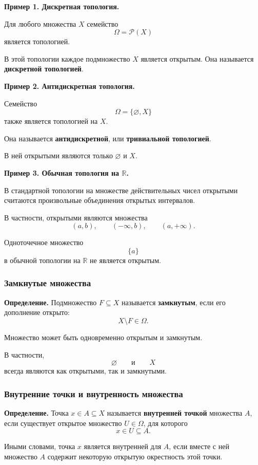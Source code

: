 \documentclass[12pt,a4paper,oneside,openany]{book}
\theoremstyle{definition}
\theoremstyle{plain}
\theoremstyle{remark}
\begin{document}
\textbf{Пример 1. Дискретная топология.}

Для любого множества \(X\) семейство
\[
\Omega=\mathcal P(X)
\]
является топологией.

В этой топологии каждое подмножество \(X\) является открытым.
Она называется \textbf{дискретной топологией}.

\textbf{Пример 2. Антидискретная топология.}

Семейство
\[
\Omega=\{\varnothing,X\}
\]
также является топологией на \(X\).

Она называется \textbf{антидискретной}, или
\textbf{тривиальной топологией}.

В ней открытыми являются только \(\varnothing\) и \(X\).

\textbf{Пример 3. Обычная топология на \(\mathbb R\).}

В стандартной топологии на множестве действительных чисел открытыми
считаются произвольные объединения открытых интервалов.

В частности, открытыми являются множества
\[
(a,b),
\qquad
(-\infty,b),
\qquad
(a,+\infty).
\]

Одноточечное множество
\[
\{a\}
\]
в обычной топологии на \(\mathbb R\) не является открытым.

\subsubsection{Замкнутые множества}

\textbf{Определение.}
Подмножество \(F\subseteq X\) называется
\textbf{замкнутым}, если его дополнение открыто:
\[
X\setminus F\in\Omega.
\]

Множество может быть одновременно открытым и замкнутым.

В частности,
\[
\varnothing
\qquad\text{и}\qquad
X
\]
всегда являются как открытыми, так и замкнутыми.


\subsubsection{Внутренние точки и внутренность множества}

\textbf{Определение.}
Точка \(x\in A\subseteq X\) называется
\textbf{внутренней точкой} множества \(A\), если существует открытое
множество \(U\in\Omega\), для которого
\[
x\in U\subseteq A.
\]

Иными словами, точка \(x\) является внутренней для \(A\), если вместе
с ней множество \(A\) содержит некоторую открытую окрестность этой
точки.
\end{document}
